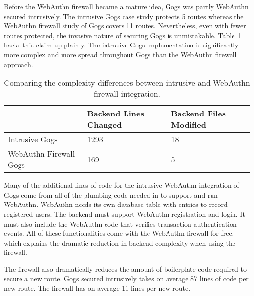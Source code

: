 Before the WebAuthn firewall became a mature idea, Gogs was partly WebAuthn secured intrusively. The intrusive Gogs case study protects 5 routes whereas the WebAuthn firewall study of Gogs covers 11 routes. Nevertheless, even with fewer routes protected, the invasive nature of securing Gogs is unmistakable. Table~\ref{Table:EvaluationsComplexityDiffIntrusiveFirewall} backs this claim up plainly. The intrusive Gogs implementation is significantly more complex and more spread throughout Gogs than the WebAuthn firewall approach.

\begin{table}[h]
\centering

\begin{tabular}{ m{5cm} m{4.5cm} m{4.5cm}  } 
 \hline
 & Backend Lines Changed & Backend Files Modified \\ 
 \hline \hline

 Intrusive Gogs & 1293 & 18 \\ \hline

 WebAuthn Firewall Gogs & 169 & 5 \\ \hline


\end{tabular}
\caption{Comparing the complexity differences between intrusive and WebAuthn firewall integration.}
\label{Table:EvaluationsComplexityDiffIntrusiveFirewall}
\end{table}

Many of the additional lines of code for the intrusive WebAuthn integration of Gogs come from all of the plumbing code needed in to support and run WebAuthn. WebAuthn needs its own database table with entries to record registered users. The backend must support WebAuthn registration and login. It must also include the WebAuthn code that verifies transaction authentication events. All of these functionalities come with the WebAuthn firewall for free, which explains the dramatic reduction in backend complexity when using the firewall.

The firewall also dramatically reduces the amount of boilerplate code required to secure a new route. Gogs secured intrusively takes on average 87 lines of code per new route. The firewall has on average 11 lines per new route.



